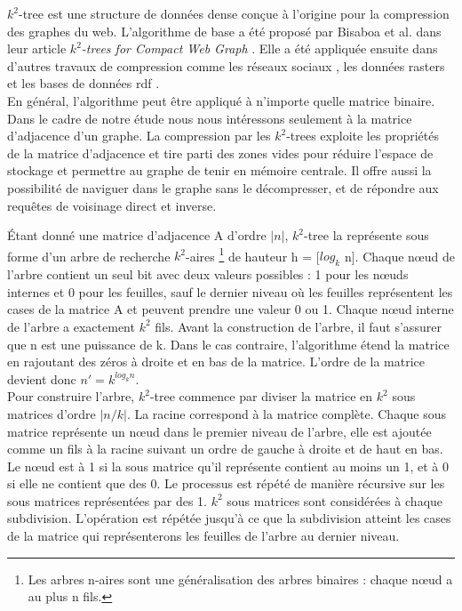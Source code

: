 $k^2$-tree est une structure de données dense conçue à l'origine pour la compression des graphes du web. L'algorithme de base a été proposé par Bisaboa et al. dans leur article \textit{$k^2$-trees for Compact Web Graph} \citep{brisaboa2009k}. Elle a été appliquée ensuite dans d'autres travaux de compression comme les réseaux sociaux \citep{shi2012optimizing}, les données rasters \citep{de2013compact} et les bases de données \gls{rdf} \citep{alvarez2017succinct}.\\

En général, l'algorithme peut être appliqué à n'importe quelle matrice binaire. Dans le cadre de notre étude nous nous intéressons seulement à la matrice d'adjacence d'un graphe.
La compression par les $k^2$-trees exploite les propriétés de la matrice d'adjacence et tire parti des zones vides pour réduire l'espace de stockage et permettre au graphe de tenir en mémoire centrale. Il offre aussi la possibilité de naviguer dans le graphe sans le décompresser, et de répondre aux requêtes de voisinage direct et inverse.

Étant donné une matrice d'adjacence A d'ordre $|n|$, $k^2$-tree la représente sous forme d'un arbre de recherche $k^2$-aires \footnote{Les arbres n-aires sont une généralisation des arbres binaires : chaque nœud a au plus n fils.} de hauteur h = [$log_{k}$ n]. Chaque nœud de l'arbre contient un seul bit avec deux valeurs possibles : 1 pour les nœuds internes et 0 pour les feuilles, sauf le dernier niveau où les feuilles représentent les cases de la matrice A et peuvent prendre une valeur 0 ou 1. Chaque nœud interne de l'arbre a exactement $k^2$ fils.  
Avant la construction de l'arbre, il faut s'assurer que n est une puissance de k. Dans le cas contraire, l'algorithme étend la matrice en rajoutant des zéros à droite et en bas de la matrice. L'ordre de la matrice devient donc $n'= k^{log_{k} n}$.\\

Pour construire l'arbre, $k^2$-tree commence par diviser la matrice en $k^{2}$ sous matrices d'ordre $|n/k|$. La racine correspond à la matrice complète. Chaque sous matrice représente un nœud dans le premier niveau de l'arbre, elle est ajoutée comme un fils à la racine suivant un ordre de gauche à droite et de haut en bas. Le nœud est à 1 si la sous matrice qu'il représente contient au moins un 1, et à 0 si elle ne contient que des 0. Le processus est répété de manière récursive sur les sous matrices représentées par des 1. $k^{2}$ sous matrices sont considérées à chaque subdivision. L'opération est répétée jusqu'à ce que la subdivision atteint les cases de la matrice qui représenterons les feuilles de l'arbre au dernier niveau. 

